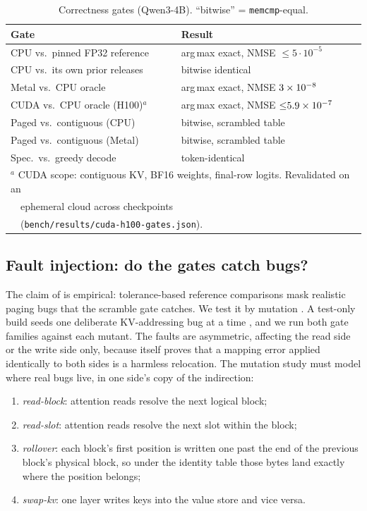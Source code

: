 \documentclass[sigconf,nonacm,screen]{acmart}
\newcommand{\code}[1]{\texttt{\small #1}}
\begin{document}
\begin{table}[t]\centering\small
\caption{Correctness gates (Qwen3-4B). ``bitwise'' = \code{memcmp}-equal.}
\label{tab:correct}
\begin{tabular}{ll}
\toprule
Gate & Result \\
\midrule
CPU vs.\ pinned FP32 reference   & arg\,max exact, NMSE ${\le}5{\cdot}10^{-5}$ \\
CPU vs.\ its own prior releases  & bitwise identical \\
Metal vs.\ CPU oracle            & arg\,max exact, NMSE $3\times 10^{-8}$ \\
CUDA vs.\ CPU oracle (H100)$^a$  & arg\,max exact, NMSE ${\le}5.9\times 10^{-7}$ \\
Paged vs.\ contiguous (CPU)      & bitwise, scrambled table \\
Paged vs.\ contiguous (Metal)    & bitwise, scrambled table \\
Spec.\ vs.\ greedy decode        & token-identical \\
\bottomrule
\multicolumn{2}{l}{\scriptsize $^a$ CUDA scope: contiguous KV, BF16
weights, final-row logits. Revalidated on an} \\
\multicolumn{2}{l}{\scriptsize \ \ ephemeral cloud \CudaGpuName{} across
\CudaCheckpointCount{} checkpoints} \\
\multicolumn{2}{l}{\scriptsize \ \ (\code{bench/results/cuda-h100-gates.json}).}
\end{tabular}
\end{table}

\subsection{Fault injection: do the gates catch bugs?}
\label{sec:eval-faults}
The claim of  is empirical: tolerance-based reference
comparisons mask realistic paging bugs that the scramble gate catches. We
test it by mutation \citep{demillo1978mutation,jia2011mutation}. A test-only
build seeds one deliberate KV-addressing bug at a time
\citep{hsueh1997fault}, and we run both gate families against each mutant.
The faults are asymmetric, affecting the read side or the write side only,
because  itself proves that a mapping error applied
identically to both sides is a harmless relocation. The mutation study must
model where real bugs live, in one side's copy of the indirection:

\begin{enumerate}\itemsep1pt
  \item \emph{read-block}: attention reads resolve the next logical block;
  \item \emph{read-slot}: attention reads resolve the next slot within the
  block;
  \item \emph{rollover}: each block's first position is written one past
  the end of the previous block's physical block, so under the identity
  table those bytes land exactly where the position belongs;
  \item \emph{swap-kv}: one layer writes keys into the value store and
  vice versa.
\end{enumerate}
\end{document}

